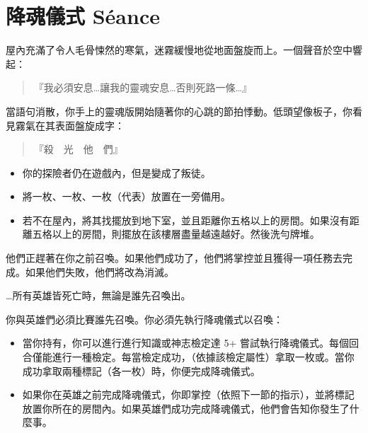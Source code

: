 
\chapter{降魂儀式 Séance}

\begin{HauntStory}
  屋內充滿了令人毛骨悚然的寒氣，迷霧緩慢地從地面盤旋而上。一個聲音於空中響起：

  \begin{quote}
    『我必須安息…讓我的靈魂安息…否則死路一條…』
  \end{quote}

  當語句消散，你手上的靈魂版開始隨著你的心跳的節拍悸動。低頭望像板子，你看見霧氣在其表面盤旋成字：

  \begin{quote}
    『殺　光　他　們』
  \end{quote}
\end{HauntStory}

\vspace*{-1em}
\begin{itemize}
  \item 你的探險者仍在遊戲內，但是變成了叛徒。
  \item 將一枚、一枚、一枚（代表）放置在一旁備用。
  \item 若不在屋內，將其找擺放到地下室，並且距離你五格以上的房間。如果沒有距離五格以上的房間，則擺放在該樓層盡量越遠越好。然後洗勻牌堆。
\end{itemize}

他們正趕著在你之前召喚。如果他們成功了，他們將掌控並且獲得一項任務去完成。如果他們失敗，他們將改為消滅。

…所有英雄皆死亡時，無論是誰先召喚出。

你與英雄們必須比賽誰先召喚。你必須先執行降魂儀式以召喚：
\begin{itemize}
  \item 當你持有，你可以進行進行知識或神志檢定達 5+ 嘗試執行降魂儀式。每個回合僅能進行一種檢定。每當檢定成功，（依據該檢定屬性）拿取一枚或。當你成功拿取兩種標記（各一枚）時，你便完成降魂儀式。
  \item 如果你在英雄之前完成降魂儀式，你即掌控（依照下一節的指示），並將標記放置你所在的房間內。如果英雄們成功完成降魂儀式，他們會告知你發生了什麼事。
\end{itemize}

